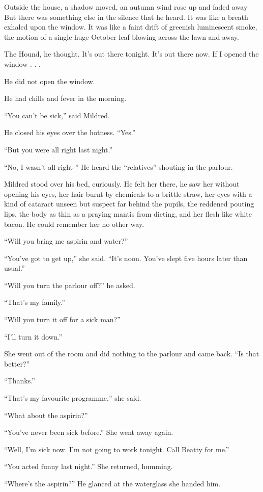\documentclass[11pt,openany]{book}
\begin{document}
Outside the house, a shadow moved, an autumn wind rose up and faded away But there was something else in the silence that he heard. It was like a breath exhaled upon the window. It was like a faint drift of greenish luminescent smoke, the motion of a single huge October leaf blowing across the lawn and away.

The Hound, he thought. It's out there tonight. It's out there now. If I opened the window . . .

He did not open the window.

He had chills and fever in the morning.

``You can't be sick,'' said Mildred.

He closed his eyes over the hotness. ``Yes.''

``But you were all right last night.''

``No, I wasn't all right '' He heard the ``relatives'' shouting in the parlour.

Mildred stood over his bed, curiously. He felt her there, he saw her without opening his eyes, her hair burnt by chemicals to a brittle straw, her eyes with a kind of cataract unseen but suspect far behind the pupils, the reddened pouting lips, the body as thin as a praying mantis from dieting, and her flesh like white bacon. He could remember her no other way.

``Will you bring me aspirin and water?''

``You've got to get up,'' she said. ``It's noon. You've slept five hours later than usual.''

``Will you turn the parlour off?'' he asked.

``That's my family.''

``Will you turn it off for a sick man?''

``I'll turn it down.''

She went out of the room and did nothing to the parlour and came back. ``Is that better?''

``Thanks.''

``That's my favourite programme,'' she said.

``What about the aspirin?''

``You've never been sick before.'' She went away again.

``Well, I'm sick now. I'm not going to work tonight. Call Beatty for me.''

``You acted funny last night.'' She returned, humming.

``Where's the aspirin?'' He glanced at the waterglass she handed him.
\end{document}
